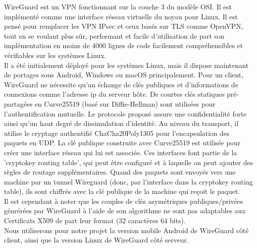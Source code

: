 \documentclass[12pt, openany]{report}
\begin{document}
\begin{flushleft}
WireGuard est un VPN fonctionnant sur la couche 3 du modèle OSI. Il est implémenté comme une interface réseau virtuelle du noyau pour Linux. Il est pensé pour remplacer les VPN IPsec et ceux basés sur TLS comme OpenVPN, tout en se voulant plus sûr, performant et facile d'utilisation de part son implémentation en moins de 4000 lignes de code facilement compréhensibles et vérifiables sur les systèmes Linux.\\
Il a été initialement déployé pour les systèmes Linux, mais il dispose maintenant de portages sous Android, Windows ou macOS principalement. Pour un client, WireGuard ne nécessite qu'un échange de clés publiques et d'informations de connexions comme l'adresse ip du serveur hôte. De courtes clés statiques pré-partagées en Curve25519 (basé sur Diffie-Hellman) sont utilisées pour l'authentification mutuelle. Le protocole proposé assure une confidentialité forte ainsi qu'un haut degré de dissimulation d'identité. Au niveau du transport, il utilise le cryptage authentifié ChaCha20Poly1305 pour l'encapsulation des paquets en UDP.  La clé publique construite avec Curve25519 est utilisée pour créer une interface réseau qui lui est associée. Ces interfaces font partie de la 'cryptokey routing table', qui peut être configuré et à laquelle on peut ajouter des règles de routage supplémentaires. Quand des paquets sont envoyés vers une machine par un tunnel Wireguard (donc, par l'interface dans la cryptokey routing table), ils sont chiffrés avec la clé publique de la machine qui reçoit le paquet.\\
Il est cependant à noter que les couples de clés asymétriques publiques/privées génrérées par WireGuard à l'aide de son algorithme ne sont pas adaptables aux Certificats X509 de part leur format (32 caractères 64 bits).\\
Nous utiliserons pour notre projet la version mobile Android de WireGuard côté client, ainsi que la version Linux de WireGuard côté serveur.

\end{flushleft}
\end{document}
